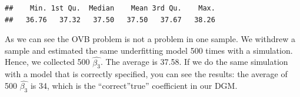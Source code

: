\documentclass[
]{book}
\newenvironment{Shaded}{\begin{snugshade}}{\end{snugshade}}
\newcommand{\AttributeTok}[1]{\textcolor[rgb]{0.77,0.63,0.00}{#1}}
\newcommand{\CommentTok}[1]{\textcolor[rgb]{0.56,0.35,0.01}{\textit{#1}}}
\newcommand{\ConstantTok}[1]{\textcolor[rgb]{0.00,0.00,0.00}{#1}}
\newcommand{\ControlFlowTok}[1]{\textcolor[rgb]{0.13,0.29,0.53}{\textbf{#1}}}
\newcommand{\DecValTok}[1]{\textcolor[rgb]{0.00,0.00,0.81}{#1}}
\newcommand{\FunctionTok}[1]{\textcolor[rgb]{0.00,0.00,0.00}{#1}}
\newcommand{\NormalTok}[1]{#1}
\newcommand{\OtherTok}[1]{\textcolor[rgb]{0.56,0.35,0.01}{#1}}
\newcommand{\SpecialCharTok}[1]{\textcolor[rgb]{0.00,0.00,0.00}{#1}}
\newcommand{\StringTok}[1]{\textcolor[rgb]{0.31,0.60,0.02}{#1}}
\begin{document}
\begin{Shaded}
\end{Shaded}

\begin{verbatim}
##    Min. 1st Qu.  Median    Mean 3rd Qu.    Max. 
##   36.76   37.32   37.50   37.50   37.67   38.26
\end{verbatim}

As we can see the OVB problem is not a problem in one sample. We withdrew a sample and estimated the same underfitting model 500 times with a simulation. Hence, we collected 500 \(\hat{\beta_3}\). The average is 37.58. If we do the same simulation with a model that is correctly specified, you can see the results: the average of 500 \(\hat{\beta_3}\) is 34, which is the ``correct''true'' coefficient in our DGM.
\end{document}
